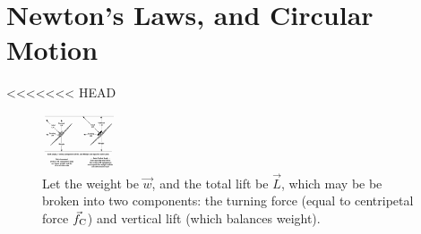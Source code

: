 \documentclass[10pt]{article}
\begin{document}
\section{Newton's Laws, and Circular Motion}
<<<<<<< HEAD
\begin{figure}[ht]
\centering
\includegraphics[width=0.2\textwidth,trim=10cm 4.84cm 0cm 0.6cm,clip=true]{figures/bank.png}
\caption{\label{fig:bank} Let the weight be $\vec{w}$, and the total lift be $\vec{L}$, which may be be broken into two components: the turning force (equal to centripetal force $\vec{f}_{\rm C}$) and vertical lift (which balances weight).}
\end{figure}
\end{document}
